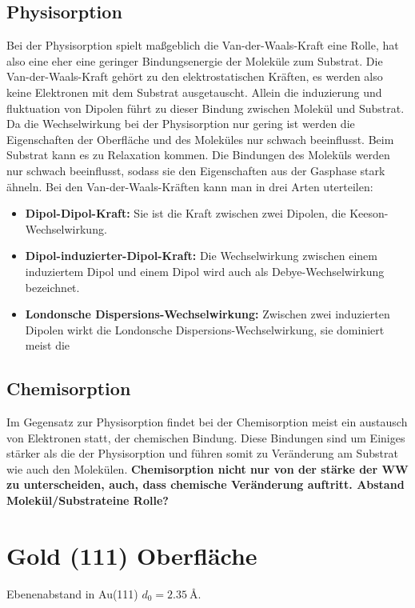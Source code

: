         \subsection{Physisorption}
            Bei der Physisorption spielt maßgeblich die Van-der-Waals-Kraft eine Rolle, hat also eine eher eine geringer Bindungsenergie der Moleküle zum Substrat.
            Die Van-der-Waals-Kraft gehört zu den elektrostatischen Kräften, es werden also keine Elektronen mit dem Substrat ausgetauscht.
            Allein die induzierung und fluktuation von Dipolen führt zu dieser Bindung zwischen Molekül und Substrat.
            Da die Wechselwirkung bei der Physisorption nur gering ist werden die Eigenschaften der Oberfläche und des Moleküles nur schwach beeinflusst.
            Beim Substrat kann es zu Relaxation kommen.
            Die Bindungen des Moleküls werden nur schwach beeinflusst, sodass sie den Eigenschaften aus der Gasphase stark ähneln.
            Bei den Van-der-Waals-Kräften kann man in drei Arten uterteilen:
            \begin{itemize}
                \item \textbf{Dipol-Dipol-Kraft:} Sie ist die Kraft zwischen zwei Dipolen, die Keeson-Wechselwirkung.
                \item \textbf{Dipol-induzierter-Dipol-Kraft:} Die Wechselwirkung zwischen einem induziertem Dipol und einem Dipol wird auch als Debye-Wechselwirkung bezeichnet.
                \item \textbf{Londonsche Dispersions-Wechselwirkung:} Zwischen zwei induzierten Dipolen wirkt die Londonsche Dispersions-Wechselwirkung, sie dominiert meist die 
            \end{itemize}
        
        
        \subsection{Chemisorption}
            Im Gegensatz zur Physisorption findet bei der Chemisorption meist ein austausch von Elektronen statt, der chemischen Bindung.
            Diese Bindungen sind um Einiges stärker als die der Physisorption und führen somit zu Veränderung am Substrat wie auch den Molekülen.
            \textbf{Chemisorption nicht nur von der stärke der WW zu unterscheiden, auch, dass chemische Veränderung auftritt.
            Abstand Molekül/Substrateine Rolle?}
            
    \section{Gold (111) Oberfläche}
        \textbf{\cite{5A_1}}
        Ebenenabstand in Au(111) $d_0 = \SI{2.35}{\angstrom}$.


